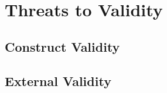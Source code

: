 \section{Threats to Validity}\label{sec:threats}

\subsection{Construct Validity}


\subsection{External Validity}
